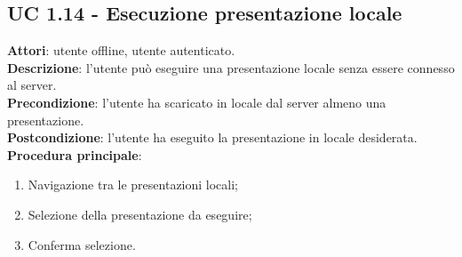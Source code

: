 \subsection{UC 1.14 - Esecuzione presentazione locale}{
\label{uc1.14}
	\textbf{Attori}: utente offline, utente autenticato.\\
	\textbf{Descrizione}: l'utente può eseguire una presentazione locale senza essere connesso al server.\\
	\textbf{Precondizione}: l'utente ha scaricato in locale dal server almeno una presentazione.\\
	\textbf{Postcondizione}: l'utente ha eseguito la presentazione in locale desiderata.\\
	\textbf{Procedura principale}:
	\begin{enumerate}
		\item Navigazione tra le presentazioni locali;
		\item Selezione della presentazione da eseguire;
		\item Conferma selezione.
	\end{enumerate}
}